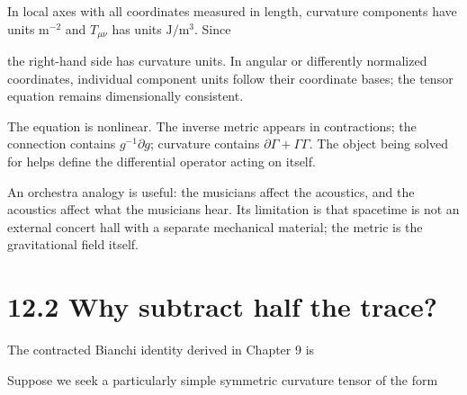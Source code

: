 \documentclass[
  11pt,
  letterpaper,
  oneside,
  openany]{scrbook}
\begin{document}
\endgroup

In local axes with all coordinates measured in length, curvature
components have units \(\mathrm{m^{-2}}\) and \(T_{\mu\nu}\) has units
\(\mathrm{J/m^3}\). Since

\begin{center}
\begingroup
{}
\ifdim\wd\grmathbox>\linewidth
\resizebox{\linewidth}{!}{\usebox{\grmathbox}}
\else\usebox{\grmathbox}\fi
\endgroup
\end{center}

the right-hand side has curvature units. In angular or differently
normalized coordinates, individual component units follow their
coordinate bases; the tensor equation remains dimensionally consistent.

The equation is nonlinear. The inverse metric appears in contractions;
the connection contains \(g^{-1}\partial g\); curvature contains
\(\partial\Gamma+\Gamma\Gamma\). The object being solved for helps
define the differential operator acting on itself.

An orchestra analogy is useful: the musicians affect the acoustics, and
the acoustics affect what the musicians hear. Its limitation is that
spacetime is not an external concert hall with a separate mechanical
material; the metric is the gravitational field itself.

\hypertarget{why-subtract-half-the-trace}{%
\section{12.2 Why subtract half the
trace?}\label{why-subtract-half-the-trace}}

The contracted Bianchi identity derived in Chapter 9 is

\begin{center}
\begingroup
{}
\ifdim\wd\grmathbox>\linewidth
\resizebox{\linewidth}{!}{\usebox{\grmathbox}}
\else\usebox{\grmathbox}\fi
\endgroup
\end{center}

Suppose we seek a particularly simple symmetric curvature tensor of the
form

\begin{center}
\begingroup
{}
\ifdim\wd\grmathbox>\linewidth
\resizebox{\linewidth}{!}{\usebox{\grmathbox}}
\else\usebox{\grmathbox}\fi
\endgroup
\end{center}
\end{document}
